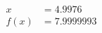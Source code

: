 \documentclass[preview]{standalone}
\begin{document}
\begin{align*}
x &= 4.9976\\f(x) &= 7.9999993
\end{align*}
\end{document}

